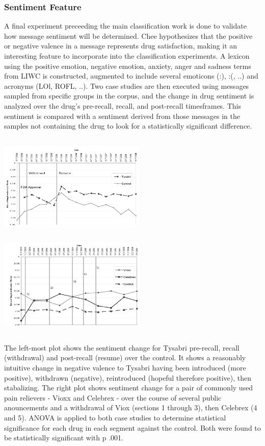 \documentclass[twoside,11pt]{article}
\begin{document}
\subsubsection{Sentiment Feature}
A final experiment preceeding the main classification work is done to validate how message sentiment will be determined. Chee hypothesizes that the positive or negative valence in a message represents drug satisfaction, making it an interesting feature to incorporate into the classification experiments. A lexicon using the positive emotion, negative emotion, anxiety, anger and sadness terms from LIWC is constructed, augmented to include several emoticons (:), :(, ..) and acronyms (LOl, ROFL, ..). Two case studies are then executed using messages sampled from specific groups in the corpus, and the change in drug sentiment is analyzed over the drug's pre-recall, recall, and post-recall timesframes. This sentiment is compared with a  sentiment derived from those messages in the samples not containing the drug to look for a statistically significant difference.

\includegraphics[width=7cm, height=5cm]{Figure-3-Tysabri.png}
\includegraphics[width=7cm, height=5cm]{Figure-4-Vioxx.png}

The left-most plot shows the sentiment change for Tysabri pre-recall, recall (withdrawal) and post-recall (resume) over the control. It shows a reasonably intuitive change in negative valence to Tysabri having been introduced (more positive), withdrawn (negative), reintroduced (hopeful therefore positive), then stabalizing. The right plot shows sentiment change for a pair of commonly used pain relievers - Vioxx and Celebrex - over the course of several public anouncements and a withdrawal of Viox (sections 1 through 3), then Celebrex (4 and 5). ANOVA is applied to both case studies to determine statistical significance for each drug in each segment against the control. Both were found to be statistically significant with p \< .001.
\end{document}
